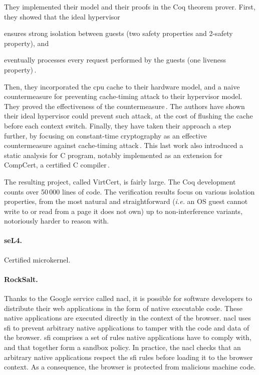 They implemented their model and their proofs in the Coq theorem prover.
%
First, they showed that the ideal hypervisor
%
\begin{inparaenum}[(1)]
\item ensures strong isolation between guests (two safety properties and
  2-safety property), and
%
\item eventually processes every request performed by the guests (one liveness
  property)\,\cite{barthe2011virtcert1}.
\end{inparaenum}
%
Then, they incorporated the \ac{cpu} cache to their hardware model, and a naive
countermeasure for preventing cache-timing attack to their hypervisor model.
%
They proved the effectiveness of the countermeasure\,\cite{barthe2012virtcert2}.
%
The authors have shown their ideal hypervisor could prevent such attack, at the
cost of flushing the cache before each context switch.
%
Finally, they have taken their approach a step further, by focusing on
constant-time cryptography as an effective countermeasure against cache-timing
attack\,\cite{barthe2014virtcert3}.
%
This last work also introduced a static analysis for C program, notably
implemented as an extension for CompCert, a certified C
compiler\,\cite{leroy2012compcert}.

The resulting project, called VirtCert, is fairly large.
%
The Coq development counts over 50\,000 lines of code.
%
The verification results focus on various isolation properties, from the most
natural and straightforward (\emph{i.e.} an OS guest cannot write to or read
from a page it does not own) up to non-interference variants, notoriously harder
to reason with.

\paragraph{seL4.}
%
Certified microkernel.

\paragraph{RockSalt.}
%
Thanks to the Google service called \ac{nacl}, it is possible for software
developers to distribute their web applications in the form of native executable
code.
%
These native applications are executed directly in the context of the browser.
%
\ac{nacl} uses \ac{sfi} to prevent arbitrary native applications to tamper with
the code and data of the browser.
%
\ac{sfi} comprises a set of rules native applications have to comply with, and
that together form a sandbox policy.
%
In practice, the \ac{nacl} checks that an arbitrary native applications respect
the \ac{sfi} rules before loading it to the browser context.
%
As a consequence, the browser is protected from malicious machine code.

